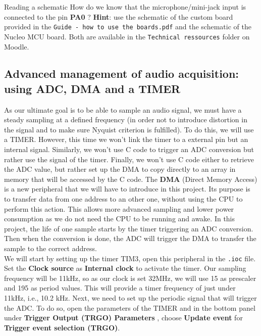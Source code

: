 \begin{bclogo}[couleur = gray!20, arrondi = 0.2, logo=\bcquestion]{Reading a schematic}
How do we know that the microphone/mini-jack input is connected to the pin \textbf{PA0} ? \textbf{Hint}: use the schematic of the custom board provided in the \texttt{Guide - how to use the boards.pdf} and the schematic of the Nucleo MCU board. Both are available in the \texttt{Technical ressources} folder on Moodle.
\end{bclogo}


\subsection{Advanced management of audio acquisition: using ADC, DMA and a TIMER}

\noindent As our ultimate goal is to be able to sample an audio signal, we must have a steady sampling at a defined frequency (in order not to introduce distortion in the signal and to make sure Nyquist criterion is fulfilled). To do this, we will use a TIMER. However, this time we won't link the timer to a external pin but an internal signal. Similarly, we won't use C code to trigger an ADC conversion but rather use the signal of the timer. Finally, we won't use C code either to retrieve the ADC value, but rather set up the DMA to copy directly to an array in memory that will be accessed by the C code. The \textbf{DMA} (Direct Memory Access) is a new peripheral that we will have to introduce in this project. Its purpose is to transfer data from one address to an other one, without using the CPU to perform this action. This allows more advanced sampling and lower power consumption as we do not need the CPU to be running and awake. In this project, the life of one sample starts by the timer triggering an ADC conversion. Then when the conversion is done, the ADC will trigger the DMA to transfer the sample to the correct address. \\

\noindent We will start by setting up the timer TIM3, open this peripheral in the \texttt{.ioc} file. Set the \textbf{Clock source} as \textbf{Internal clock} to activate the timer. Our sampling frequency will be 11kHz, so as our clock is set 32MHz, we will use 15 as prescaler and 195 as period values. This will provide a timer frequency of just under 11kHz, i.e., 10.2 kHz. Next, we need to set up the periodic signal that will trigger the ADC. To do so, open the parameters of the TIMER and in the bottom panel under \textbf{Trigger Output (TRGO) Parameters} , choose \textbf{Update event} for \textbf{Trigger event selection (TRGO)}. \\

